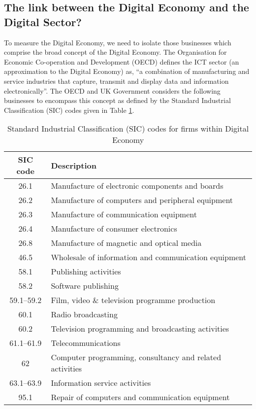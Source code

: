 \subsection{The link between the Digital Economy and the Digital Sector?}

To measure the Digital Economy, we need to isolate those businesses which comprise the broad concept of the Digital Economy. The Organisation for Economic Co-operation and Development (OECD) defines the ICT sector (an approximation to the Digital Economy) as, ``a combination of manufacturing and service industries that capture, transmit and display data and information electronically''. The OECD and UK Government considers the following businesses to encompass this concept as defined by the Standard Industrial Classification (SIC) codes given in Table \ref{table:SICcodes}.

\begin{table}[]
\label{table:SICcodes}
\centering
\begin{tabular}{cl}
\hline
SIC code    & Description                                              \\
\hline
26.1        & Manufacture of electronic components and boards          \\
26.2        & Manufacture of computers and peripheral equipment        \\
26.3        & Manufacture of communication equipment                   \\
26.4        & Manufacture of consumer electronics                      \\
26.8        & Manufacture of magnetic and optical media                \\
46.5        & Wholesale of information and communication equipment     \\
58.1        & Publishing activities                                    \\
58.2        & Software publishing                                      \\
59.1--59.2  & Film, video \& television programme production           \\
60.1        & Radio broadcasting                                       \\
60.2        & Television programming and broadcasting activities       \\
61.1--61.9  & Telecommunications                                       \\
62          & Computer programming, consultancy and related activities \\
63.1--63.9  & Information service activities                           \\
95.1        & Repair of computers and communication equipment          \\
\hline
\end{tabular}
\caption{Standard Industrial Classification (SIC) codes for firms within Digital Economy}
\end{table}

